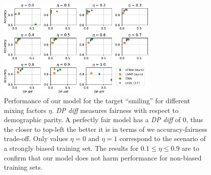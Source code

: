 \begin{figure}[tb]
    \centering
    \includegraphics[width=0.7\textwidth]{./Figures/nosinn_celeba_multiplot_all_landscape_Smiling.pdf}
    \caption{
        Performance of our model for the target ``smiling'' for different mixing factors $\eta$.
        \emph{DP diff} measures fairness with respect to demographic parity.
        A perfectly fair model has a \emph{DP diff} of 0, thus the closer to top-left the better it is in terms of we accuracy-fairness trade-off.
        Only values $\eta=0$ and $\eta=1$ correspond to the scenario of a strongly biased training set.
        The results for $0.1\leq \eta\leq 0.9$ are to confirm that our model does not harm performance for non-biased training sets.
    }%
    \label{fig:celeba-multiplot}
\end{figure}

